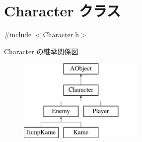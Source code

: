 \hypertarget{class_character}{\section{Character クラス}
\label{class_character}
}


{\ttfamily \#include $<$Character.\+h$>$}

Character の継承関係図\begin{figure}[H]
\begin{center}
\leavevmode
\includegraphics[height=4.000000cm]{class_character}
\end{center}
\end{figure}

